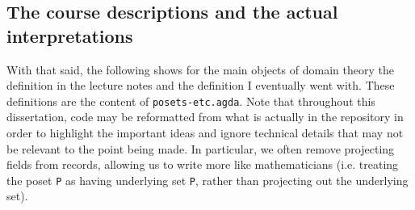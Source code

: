 \documentclass[12pt,a4paper,twoside,openright]{report}
\begin{document}
\subsection{The course descriptions and the actual interpretations}
With that said, the following shows for the main objects of domain theory the definition in the lecture notes and the definition I eventually went with. These definitions are the content of \texttt{posets-etc.agda}. Note that throughout this dissertation, code may be reformatted from what is actually in the repository in order to highlight the important ideas and ignore technical details that may not be relevant to the point being made. In particular, we often remove projecting fields from records, allowing us to write more like mathematicians (i.e. treating the poset \texttt{P} as having underlying set \texttt{P}, rather than projecting out the underlying set). 
\end{document}

